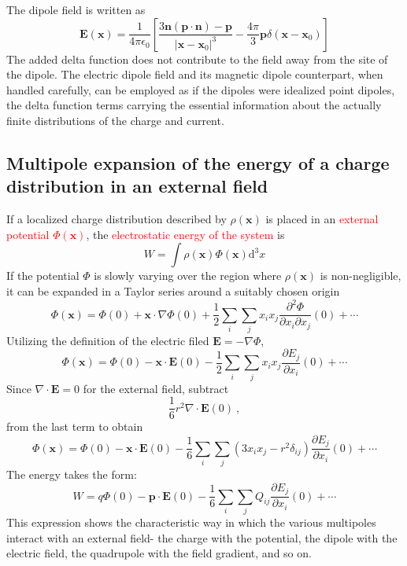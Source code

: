 \documentclass[12pt,a4paper]{article}
\renewcommand{\vec}[1]{\boldsymbol{#1}}
\newcommand{\dif}{\mathrm{d}}
\begin{document}
The dipole field is written as 
\begin{equation}
\vec{E}(\vec{x}) = \frac{1}{4\pi \epsilon_0} \left[ \frac{3\vec{n}(\vec{p}\cdot \vec{n}) -\vec{p}}{|\vec{x} -\vec{x}_0|^3} -\frac{4\pi}{3} \vec{p} \delta(\vec{x} -\vec{x}_0) \right]
\end{equation}
The added delta function does not contribute to the field away from the site of the dipole. The electric dipole field and its magnetic dipole counterpart, when handled carefully, can be employed as if the dipoles were idealized point dipoles, the delta function terms carrying the essential information about the actually finite distributions of the charge and current.

\subsection{Multipole expansion of the energy of a charge distribution in an external field}
If a localized charge distribution described by $\rho(\vec{x})$ is placed in an \textcolor{red}{external potential $\Phi(\vec{x})$}, the \textcolor{red}{electrostatic energy of the system} is
\begin{equation}
W = \int \rho(\vec{x}) \Phi(\vec{x}) \dif^3 x
\end{equation}
If the potential $\Phi$ is slowly varying over the region where $\rho(\vec{x})$ is non-negligible, it can be expanded in a Taylor series around a suitably chosen origin
\begin{equation}
\Phi(\vec{x}) = \Phi(0) +\vec{x}\cdot \nabla\Phi(0) +\frac{1}{2} \sum_i \sum_j x_i x_j \frac{\partial^2 \Phi}{\partial x_i \partial x_j}(0) +\cdots
\end{equation}
Utilizing the definition of the electric filed $\vec{E} = -\nabla \Phi$,
\begin{equation*}
\Phi(\vec{x}) = \Phi(0) -\vec{x}\cdot \vec{E}(0) -\frac{1}{2} \sum_i \sum_j x_i x_j \frac{\partial E_j}{\partial x_i}(0) +\cdots
\end{equation*}
Since $\nabla \cdot \vec{E} = 0$ for the external field, subtract
\begin{equation*}
\frac{1}{6} r^2 \nabla\cdot \vec{E}(0) ~,
\end{equation*}
from the last term to obtain
\begin{equation}
\Phi(\vec{x}) = \Phi(0) -\vec{x}\cdot \vec{E}(0) -\frac{1}{6} \sum_i \sum_j (3x_i x_j -r^2 \delta_{ij}) \frac{\partial E_j}{\partial x_i}(0) +\cdots
\end{equation}
The energy takes the form:
\begin{equation}
W = q\Phi(0) -\vec{p}\cdot \vec{E}(0)  -\frac{1}{6} \sum_i \sum_j Q_{ij} \frac{\partial E_j}{\partial x_i}(0) +\cdots
\end{equation}
This expression shows the characteristic way in which the various multipoles interact with an external field- the charge with the potential, the dipole with the electric field, the quadrupole with the field gradient, and so on.
\end{document}
